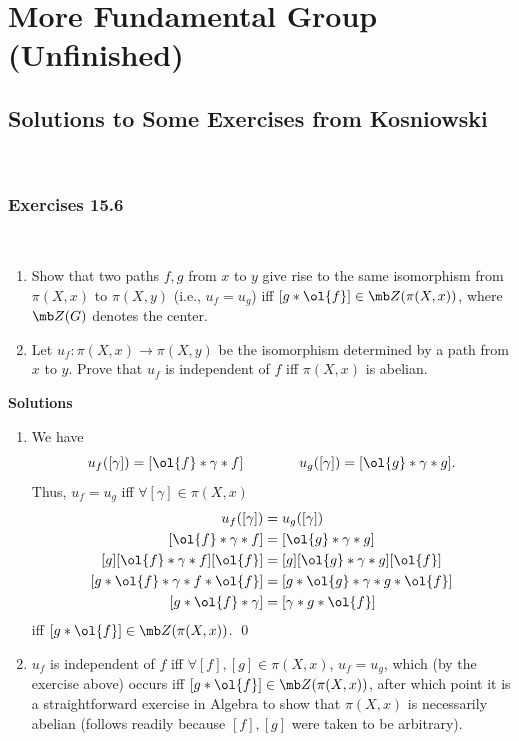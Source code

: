 \documentclass{fkbook}
\theoremstyle{snazzydefinition}
\begin{document}
\chapter{More Fundamental Group (Unfinished)}
\begin{adjustwidth}{1em}{}
  \section{Solutions to Some Exercises from Kosniowski}~
  \subsection{Exercises 15.6}~
  \begin{leftbar}
    \begin{enumerate}
      \item Show that two paths $f,g$ from $x$ to $y$ give rise to the
        same isomorphism from $\pi(X,x)$ to $\pi(X,y)$ (i.e., $u_f =
        u_g$) iff $[g * \ol{f}] \in \mb Z(\pi(X,x))$, where $\mb Z(G)$
        denotes the center.
      \item Let $u_f : \pi(X,x) \to \pi(X,y)$ be the isomorphism
        determined by a path from $x$ to $y$. Prove that $u_f$ is
        independent of $f$ iff $\pi(X,x)$ is abelian.
    \end{enumerate}
  \end{leftbar}
  \textbf{Solutions}
  \begin{enumerate}
    \item We have
      \[
        u_f([\gamma]) = [\ol{f} * \gamma * f] \qquad \qquad
        u_g([\gamma]) = [\ol{g} * \gamma * g].
      \]
      Thus, $u_f = u_g$ iff $\forall [\gamma] \in \pi(X,x)$
      \begin{align*}
        u_f([\gamma])
        &= u_g([\gamma]) \\
        [\ol{f} * \gamma * f]
        &= [\ol{g} * \gamma * g] \\
        [g] [\ol{f} * \gamma * f][\ol{f}]
        &= [g][\ol{g} * \gamma * g][\ol{f}] \\
        [g * \ol{f} * \gamma * f * \ol{f}]
        &= [g * \ol{g} * \gamma * g * \ol{f}] \\
        [g * \ol{f} * \gamma ]
        &= [\gamma * g * \ol{f}]
      \end{align*}
      iff $[g * \ol{f}] \in \mb Z(\pi(X,x))$. \qed
    \item $u_f$ is independent of $f$ iff $\forall [f], [g] \in
      \pi(X,x)$, $u_f = u_g$, which (by the exercise above) occurs iff
      $[g * \ol{f}] \in \mb Z(\pi(X,x))$, after which point it is a
      straightforward exercise in Algebra to show that $\pi(X,x)$ is
      necessarily abelian (follows readily because $[f], [g]$ were
      taken to be arbitrary).
  \end{enumerate}

\end{adjustwidth}
\end{document}
